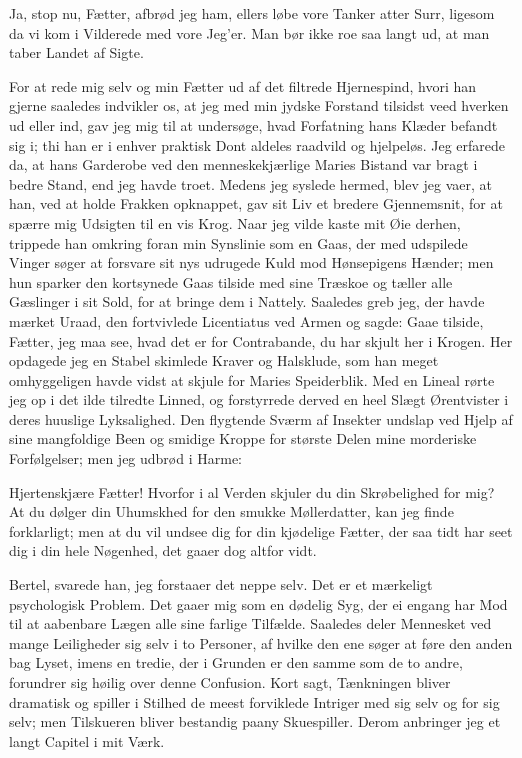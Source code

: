 \documentclass[12pt]{article}
\newcommand{\apage}[1]{\marginnote{\footnotesize\textit{[#1]}}}
\begin{document}
Ja, stop nu, Fætter, afbrød jeg ham, ellers løbe vore Tanker atter
Surr, ligesom da vi kom i Vilderede med vore Jeg'er. Man bør ikke roe
saa langt ud, at man taber Landet af Sigte.

For at rede mig selv og min Fætter ud af det filtrede Hjernespind,
hvori han gjerne saaledes indvikler os, at jeg med min jydske Forstand
tilsidst veed hverken ud eller ind, gav jeg mig til at undersøge, hvad
Forfatning hans Klæder befandt sig i; thi han er i enhver praktisk
Dont aldeles raadvild og hjelpeløs. Jeg erfarede da, at hans Garderobe
ved den menneskekjærlige Maries Bistand var bragt i bedre Stand, end
jeg havde troet. Medens jeg syslede hermed, blev jeg vaer, at han,
ved at holde Frakken opknappet, gav sit Liv et bredere Gjennemsnit,
for at spærre mig Udsigten til en vis Krog. Naar jeg vilde kaste mit
Øie derhen, trippede han omkring foran min Synslinie som en Gaas, der
med udspilede Vinger søger at forsvare sit nys udrugede Kuld mod
Hønsepigens Hænder; men hun sparker den kortsynede Gaas tilside med
sine Træskoe og tæller alle Gæslinger i sit Sold, for at bringe dem i
Nattely. Saaledes greb jeg, der havde mærket Uraad, den fortvivlede
Licentiatus ved Armen og sagde: Gaae tilside, Fætter, jeg maa see,
hvad det er for Contrabande, du har skjult her i Krogen. Her opdagede
jeg en Stabel skimlede Kraver og Halsklude, som han meget omhyggeligen
havde vidst at skjule for Maries Speiderblik. Med en Lineal rørte jeg
op i det ilde tilredte Linned, og forstyrrede derved en heel Slægt
Ørentvister i deres huuslige Lyksalighed. Den flygtende Sværm af
Insekter undslap ved Hjelp af sine mangfoldige Been og smidige Kroppe
for største Delen mine morderiske Forfølgelser; men jeg udbrød i Harme:

Hjertenskjære Fætter! Hvorfor i al Verden skjuler du din
Skrøbelighed for mig? At du dølger din Uhumskhed for den \apage{95}smukke
Møllerdatter, kan jeg finde forklarligt; men at du vil undsee dig for
din kjødelige Fætter, der saa tidt har seet dig i din hele Nøgenhed,
det gaaer dog altfor vidt.

Bertel, svarede han, jeg forstaaer det neppe selv. Det er et
mærkeligt psychologisk Problem. Det gaaer mig som en dødelig Syg, der
ei engang har Mod til at aabenbare Lægen alle sine farlige Tilfælde.
Saaledes deler Mennesket ved mange Leiligheder sig selv i to Personer,
af hvilke den ene søger at føre den anden bag Lyset, imens en tredie,
der i Grunden er den samme som de to andre, forundrer sig høilig over
denne Confusion. Kort sagt, Tænkningen bliver dramatisk og spiller i
Stilhed de meest forviklede Intriger med sig selv og for sig selv; men
Tilskueren bliver bestandig paany Skuespiller. Derom anbringer jeg et
langt Capitel i mit Værk.
\end{document}
